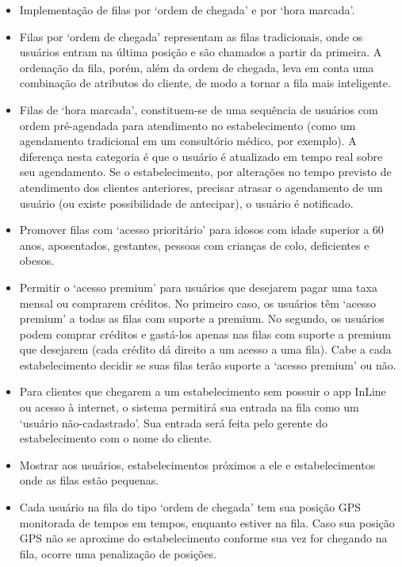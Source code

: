 \documentclass{book}
\begin{document}
\begin{itemize}
\item Implementação de filas por ‘ordem de chegada’ e por ‘hora marcada’.
\item Filas por ‘ordem de chegada’ representam as filas tradicionais, onde os
  usuários entram na última posição e são chamados a partir da primeira. A
  ordenação da fila, porém, além da ordem de chegada, leva em conta uma
  combinação de atributos do cliente, de modo a tornar a fila mais inteligente.
\item Filas de ‘hora marcada’, constituem-se de uma sequência de usuários com
  ordem pré-agendada para atendimento no estabelecimento (como um agendamento
  tradicional em um consultório médico, por exemplo). A diferença nesta
  categoria é que o usuário é atualizado em tempo real sobre seu agendamento. Se
  o estabelecimento, por alterações no tempo previsto de atendimento dos
  clientes anteriores, precisar atrasar o agendamento de um usuário (ou existe
  possibilidade de antecipar), o usuário é notificado.
\item Promover filas com ‘acesso prioritário’ para idosos com idade superior a
  60 anos, aposentados, gestantes, pessoas com crianças de colo, deficientes e
  obesos.
\item Permitir o ‘acesso premium’ para usuários que desejarem pagar uma taxa
  mensal ou comprarem créditos. No primeiro caso, os usuários têm ‘acesso
  premium’ a todas as filas com suporte a premium. No segundo, os usuários podem
  comprar créditos e gastá-los apenas nas filas com suporte a premium que
  desejarem (cada crédito dá direito a um acesso a uma fila). Cabe a cada
  estabelecimento decidir se suas filas terão suporte a ‘acesso premium’ ou não.
\item Para clientes que chegarem a um estabelecimento sem possuir o app InLine
  ou acesso à internet, o sistema permitirá sua entrada na fila como um ‘usuário
  não-cadastrado’. Sua entrada será feita pelo gerente do estabelecimento com o
  nome do cliente.
\item Mostrar aos usuários, estabelecimentos próximos a ele e estabelecimentos
  onde as filas estão pequenas.
\item Cada usuário na fila do tipo ‘ordem de chegada’ tem sua posição GPS
  monitorada de tempos em tempos, enquanto estiver na fila. Caso sua posição GPS
  não se aproxime do estabelecimento conforme sua vez for chegando na fila,
  ocorre uma penalização de posições.
\end{itemize}
\end{document}
